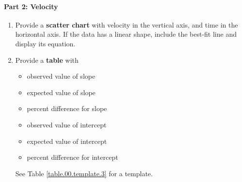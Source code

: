 \paragraph{Part 2: Velocity}
%
\begin{enumerate}
    \item Provide a \textbf{scatter chart} with velocity in the vertical axis, and time in the horizontal axis. If the data has a linear shape, include the best-fit line and display its equation.
    \item Provide a \textbf{table} with
    \begin{itemize}
        \item observed value of slope
        \item expected value of slope
        \item percent difference for slope
        \item observed value of intercept
        \item expected value of intercept
        \item percent difference for intercept
    \end{itemize}
    See Table \ref{table.00.template.3} for a template.
\end{enumerate}
%
\newpage
